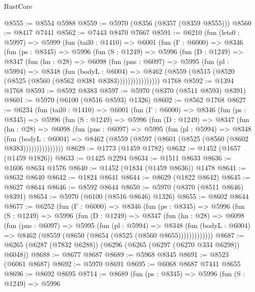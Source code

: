 \begin{lexlean}{RustCore}
\begin{coremodule}
@8555 := @8554 @5988
@8559 := @5970 (@8356 (@8357 (@8359 @8555)))
@8560 := @8417 @7441
@8562 := @7443 @8470 @7667
@8591 := @6210
    (fun (lets0 : @5997) =>
    @5999
      (fun (tail0 : @1410) =>
      @6001
        (fun (Γ : @6000) =>
        @8346
          (fun (ps : @8345) =>
          @5996
            (fun (S : @1249) =>
            @5996
              (fun (D : @1249) =>
              @8347
                (fun (hn : @28) =>
                @6098
                  (fun (pns : @6097) =>
                  @5995
                    (fun (pl : @5994) =>
                    @8348
                      (fun (bodyL : @6004) =>
                      @8462 (@8559 (@8515 (@8520 (@8525 (@8560 (@8562 @8381 @8383))))))))))))))))
    @1768
@8592 := @1394 @1768
@8593 := @8592 @8383
@8597 := @5970 (@8370 (@8511 @8593) @8391)
@8601 := @5970 (@6100 (@8516 @8593) @1326)
@8602 := @8562 @1768
@8627 := @6234
    (fun (tail0 : @1410) =>
    @6001
      (fun (Γ : @6000) =>
      @8346
        (fun (ps : @8345) =>
        @5996
          (fun (S : @1249) =>
          @5996
            (fun (D : @1249) =>
            @8347
              (fun (hn : @28) =>
              @6098
                (fun (pns : @6097) =>
                @5995
                  (fun (pl : @5994) =>
                  @8348
                    (fun (bodyL : @6004) =>
                    @8462 (@8559 (@8597 (@8601 (@8525 (@8560 (@8602 @8383)))))))))))))))
@8629 := @1773 (@1459 @1782)
@8632 := @1452 (@1657 (@1459 @1826))
@8633 := @1425 @2294
@8634 := @1511 @8633
@8636 := @1606 @8634 @1576
@8640 := @1452 (@1834 (@1459 @8636)) @1478
@8641 := @8632 @8640
@8642 := @1824 @8641
@8644 := @8629 (@1822 @8642)
@8645 := @8627 @8644
@8646 := @8592 @8644
@8650 := @5970 (@8370 (@8511 @8646) @8391)
@8654 := @5970 (@6100 (@8516 @8646) @1326)
@8655 := @8602 @8644
@8677 := @6252
    (fun (Γ : @6000) =>
    @8346
      (fun (ps : @8345) =>
      @5996
        (fun (S : @1249) =>
        @5996
          (fun (D : @1249) =>
          @8347
            (fun (hn : @28) =>
            @6098
              (fun (pns : @6097) =>
              @5995
                (fun (pl : @5994) =>
                @8348
                  (fun (bodyL : @6004) =>
                  @8462 (@8559 (@8650 (@8654 (@8525 (@8560 @8655)))))))))))))
@8687 := @6265 (@6287 (@7832 @6288)) (@6296 (@6265 (@6297 (@6270 @334 @6298)) @6048))
@8688 := @8677 @8687
@8689 := @5968 @8345
@8691 := @8523 (@6061 @8687)
@8692 := @5970 @8691
@8695 := @6068 @8687 @7441 @8655
@8696 := @8692 @8695
@8714 := @8689
    (fun (ps : @8345) =>
    @5996
      (fun (S : @1249) =>
      @5996

\end{coremodule}
\end{lexlean}
